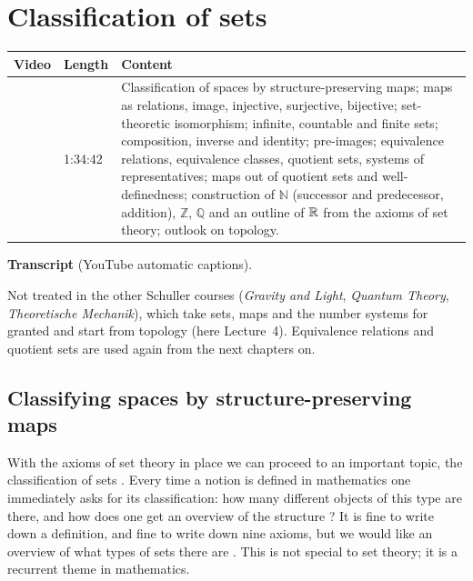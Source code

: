 \chapter{Classification of sets}\label{ch:l03}
\begin{paracol}{2}

\begin{sources}
\begin{tabularx}{\linewidth}{@{}l l L@{}}
\toprule
\textbf{Video} & \textbf{Length} & \textbf{Content}\\
\midrule
{} & 1:34:42 & Classification of spaces by structure-preserving
maps; maps as relations, image, injective, surjective, bijective; set-theoretic isomorphism; infinite, countable and
finite sets; composition, inverse and identity; pre-images; equivalence relations, equivalence classes,
quotient sets, systems of representatives; maps out of quotient sets and well-definedness; construction of
$\mathbb N$ (successor and predecessor, addition), $\mathbb Z$, $\mathbb Q$ and an outline of $\mathbb{R}$ from the axioms of
set theory; outlook on topology.\\
\bottomrule
\end{tabularx}

\smallskip
\textbf{Transcript}  (YouTube automatic captions).
\end{sources}

\begin{reading}
Not treated in the other Schuller courses (\emph{Gravity and Light}, \emph{Quantum Theory}, \emph{Theoretische
Mechanik}), which take sets, maps and the number systems for granted and start from topology (here
Lecture~4). Equivalence relations and quotient sets are used again from the next chapters on.
\end{reading}

\section{Classifying spaces by structure-preserving maps}\label{sec:cl-idea}

With the axioms of set theory in place we can proceed to an important topic, the classification of sets
. Every time a notion is defined in mathematics one immediately asks for its classification: how many
different objects of this type are there, and how does one get an overview of the structure ? It is fine
to write down a definition, and fine to write down nine axioms, but we would like an overview of what types of sets
there are . This is not special to set theory; it is a recurrent theme in mathematics.


\end{paracol}
